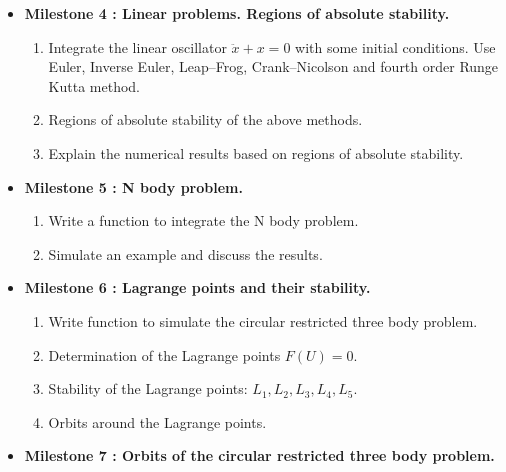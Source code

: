 \documentclass[12pt, a4paper]{article}
\begin{document}
\begin{itemize}
\begin{enumerate}
\end{enumerate} 


\item {\bf Milestone 4 : Linear problems. Regions of absolute stability.}  
  \begin{enumerate}
\item  Integrate the linear oscillator $ \ddot x+ x =0$ with some initial conditions.  
       Use Euler, Inverse Euler, Leap--Frog, Crank--Nicolson and fourth order Runge Kutta
        method.  
\item Regions of absolute stability of the above methods. 
\item Explain the numerical results based on regions of absolute stability.
\end{enumerate}
 


\item {\bf Milestone 5 : N  body problem.}    

 \begin{enumerate} 
    
     \item Write a function to integrate the N body problem.  
     \item Simulate an example and discuss the results. 
 \end{enumerate}





\item {\bf Milestone 6 : Lagrange points and their stability. }                                                      




\begin{enumerate}
\item Write function to simulate  the  circular restricted three body 
problem.
\item Determination of the Lagrange points $ F(U) = 0$. 
\item Stability of the Lagrange points: $ L_1, L_2 ,L_3,  L_4, L_5 $.
\item Orbits around the Lagrange points.

 \end{enumerate}
 
 

\item {\bf Milestone 7 : Orbits of the circular restricted three body 
    problem.}    


\end{itemize}
\end{document}
